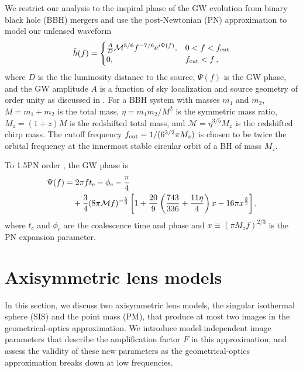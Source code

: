 \documentclass[floats,floatfix,showpacs,amssymb,prd,twocolumn,superscriptaddress,nofootinbib,nolongbibliography,reprint]{revtex4-2}
\begin{document}
We restrict our analysis to the inspiral phase of the GW evolution from binary black hole (BBH) mergers and use the post-Newtonian (PN) approximation to model our unlensed waveform \cite{PhysRevD.49.2658}
\begin{align} \label{eq:gw waveform}
    \tilde{h}(f)= 
    \begin{cases}
    \frac{A}{D} \mathcal{M}^{5/6} f^{-7/6} e^{i \Psi(f)},&  0 < f < f_{\rm cut}\\
    0,              & f_{\rm cut} < f\,,
    \end{cases}
\end{align}
where $D$ is the the luminosity distance to the source, $\Psi(f)$ is the GW phase, and the GW amplitude $A$ is a function of sky localization and source geometry of order unity as discussed in \cite{1994PhRvD..49.6274A}. For a BBH system with masses $m_1$ and $m_2$, $M = m_1 + m_2$ is the total mass, $\eta = m_1m_2/M^2$ is the symmetric mass ratio, $M_z = (1+z)M$ is the redshifted total mass, and $\mathcal{M} = \eta^{3/5}M_z$ is the redshifted chirp mass. The cutoff frequency $f_{\rm cut} = 1/(6^{3/2} \pi M_z)$ is chosen to be twice the orbital frequency at the innermost stable circular orbit of a BH of mass $M_z$.

To 1.5PN order \cite{PhysRevD.49.2658}, the GW phase is 
\begin{align} \label{eq:gw phase}
    \Psi(f) &= 2\pi f t_c - \phi_c - \frac{\pi}{4} \notag \\
    & \quad + \frac{3}{4} (8 \pi \mathcal{M} f)^{-\frac{5}{3}} \left[1 + \frac{20}{9} \left(\frac{743}{336} + \frac{11 \eta}{4}\right) x - 16 \pi x^\frac{3}{2}\right],
\end{align}
where $t_c$ and $\phi_c$ are the coalescence time and phase and $x \equiv (\pi M_z f)^{2/3}$ is the PN expansion parameter.

\section{\label{sec:axisymmetric lens}Axisymmetric lens models}

In this section, we discuss two axisymmetric lens models, the singular isothermal sphere (SIS) and the point mass (PM), that produce at most two images in the geometrical-optics approximation.  We introduce model-independent image parameters that describe the amplification factor $F$ in this approximation, and assess the validity of these new parameters as the geometrical-optics approximation breaks down at low frequencies.
\end{document}
